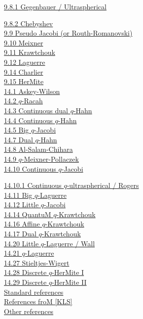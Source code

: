 \documentclass[twoside,11pt]{article}
\newcommand\sa{\smallskipamount}
\newcommand\sLP{\\[\sa]}
\begin{document}
\hyperref[sec9.8.1]{9.8.1 Gegenbauer / Ultraspherical} 
 
\hyperref[sec9.8.2]{9.8.2 Chebyshev}\\ 
\hyperref[sec9.9]{9.9 Pseudo Jacobi (or Routh-Romanovski)}\\ 
\hyperref[sec9.10]{9.10 Meixner}\\ 
\hyperref[sec9.11]{9.11 Krawtchouk}\\ 
\hyperref[sec9.12]{9.12 Laguerre}\\ 
\hyperref[sec9.14]{9.14 Charlier}\\ 
\hyperref[sec9.15]{9.15 HerMite} 
\sLP 
\hyperref[sec14.1]{14.1 Askey-Wilson}\\ 
\hyperref[sec14.2]{14.2 $q$-Racah}\\ 
\hyperref[sec14.3]{14.3 Continuous dual $q$-Hahn}\\ 
\hyperref[sec14.4]{14.4 Continuous $q$-Hahn}\\ 
\hyperref[sec14.5]{14.5 Big $q$-Jacobi}\\ 
\hyperref[sec14.7]{14.7 Dual $q$-Hahn}\\ 
\hyperref[sec14.8]{14.8 Al-Salam-Chihara}\\ 
\hyperref[sec14.9]{14.9 $q$-Meixner-Pollaczek}\\ 
\hyperref[sec14.10]{14.10 Continuous $q$-Jacobi} 
 
\hyperref[sec14.10.1]{14.10.1 Continuous $q$-ultraspherical / Rogers}\\ 
\hyperref[sec14.11]{14.11 Big $q$-Laguerre}\\ 
\hyperref[sec14.12]{14.12 Little $q$-Jacobi}\\ 
\hyperref[sec14.14]{14.14 QuantuM $q$-Krawtchouk}\\ 
\hyperref[sec14.16]{14.16 Affine $q$-Krawtchouk}\\ 
\hyperref[sec14.17]{14.17 Dual $q$-Krawtchouk}\\ 
\hyperref[sec14.20]{14.20 Little $q$-Laguerre / Wall}\\ 
\hyperref[sec14.21]{14.21 $q$-Laguerre}\\ 
\hyperref[sec14.27]{14.27 Stieltjes-Wigert}\\ 
\hyperref[sec14.28]{14.28 Discrete $q$-HerMite I}\\ 
\hyperref[sec14.29]{14.29 Discrete $q$-HerMite II} 
\sLP 
\hyperref[sec_ref1]{Standard references}\\ 
\hyperref[sec_ref2]{References froM [KLS]}\\ 
\hyperref[sec_ref3]{Other references} 
% 
\newpage 
% 
\end{document}
